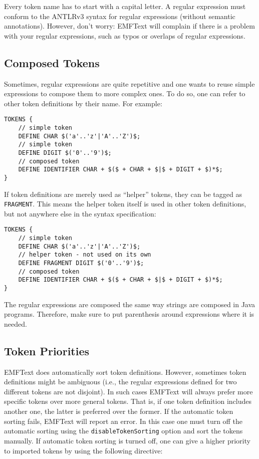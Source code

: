 Every token name has to start with a capital letter. A regular expression must
conform to the ANTLRv3 syntax for regular expressions (without semantic
annotations). However, don't worry: EMFText will complain if there is a problem
with your regular expressions, such as typos or overlaps of regular expressions.

\subsection{Composed Tokens}

Sometimes, regular expressions are quite repetitive and one wants to reuse 
simple expressions to compose them to more complex ones. To do so, one can refer 
to other token definitions by their name. For example:

\lstset{language=CS}
\begin{lstlisting}
TOKENS {
    // simple token
    DEFINE CHAR $('a'..'z'|'A'..'Z')$;
    // simple token
    DEFINE DIGIT $('0'..'9')$;
    // composed token
    DEFINE IDENTIFIER CHAR + $($ + CHAR + $|$ + DIGIT + $)*$;
}
\end{lstlisting}

If token definitions are merely used as ``helper'' tokens, they can be tagged
as \texttt{FRAGMENT}. This means the helper token itself is used in other token
definitions, but not anywhere else in the syntax specification:

\lstset{language=CS}
\begin{lstlisting}
TOKENS {
    // simple token
    DEFINE CHAR $('a'..'z'|'A'..'Z')$;
    // helper token - not used on its own
    DEFINE FRAGMENT DIGIT $('0'..'9')$;
    // composed token
    DEFINE IDENTIFIER CHAR + $($ + CHAR + $|$ + DIGIT + $)*$;
}
\end{lstlisting}

The regular expressions are composed the same way strings are composed in Java 
programs. Therefore, make sure to put parenthesis around expressions where it
is needed.

\subsection{Token Priorities}

EMFText does automatically sort token definitions. However, sometimes 
token definitions might be ambiguous (i.e., the regular expressions defined for
two different tokens are not disjoint). In such cases EMFText will always prefer
more specific tokens over more general tokens. That is, if one token definition 
includes another one, the latter is preferred over the former. If the automatic 
token sorting fails, EMFText will report an error. In this case one must turn 
off the automatic sorting using the \texttt{disableTokenSorting} option and sort 
the tokens manually. If automatic token sorting is turned off, one can give a
higher priority to imported tokens by using the following directive:

